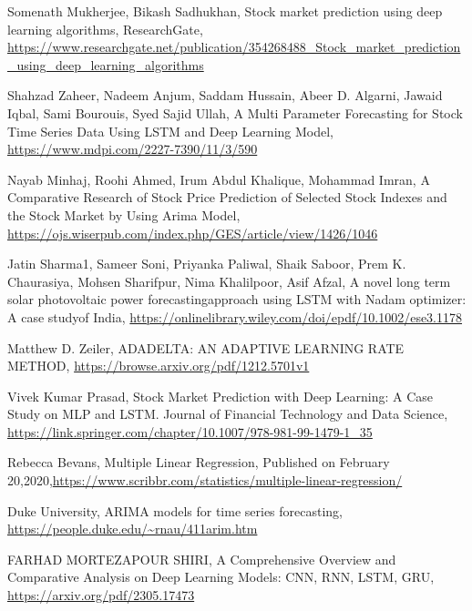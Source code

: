 \documentclass{ieeeojies}
\begin{document}
\begin{thebibliography}{00}
    Somenath Mukherjee, 
    Bikash Sadhukhan,
    Stock market prediction using deep learning algorithms,
    ResearchGate,   \url{https://www.researchgate.net/publication/354268488_Stock_market_prediction_using_deep_learning_algorithms}
    
    Shahzad Zaheer, 
    Nadeem Anjum,
    Saddam Hussain, 
    Abeer D. Algarni, 
    Jawaid Iqbal, 
    Sami Bourouis,
    Syed Sajid Ullah,
    A Multi Parameter Forecasting for Stock Time Series Data Using LSTM and Deep Learning Model,
    \url{https://www.mdpi.com/2227-7390/11/3/590}

    Nayab Minhaj, Roohi Ahmed, Irum Abdul Khalique, Mohammad Imran,
    A  Comparative  Research  of  Stock  Price  Prediction  of  Selected  Stock  Indexes and the Stock Market by Using Arima Model, \url{https://ojs.wiserpub.com/index.php/GES/article/view/1426/1046}

    Jatin Sharma1,
    Sameer Soni,
    Priyanka Paliwal,
    Shaik Saboor,
    Prem K. Chaurasiya,
    Mohsen Sharifpur,
    Nima Khalilpoor,
    Asif Afzal,
    A novel long term solar photovoltaic power forecastingapproach using LSTM with Nadam optimizer: A case studyof India,
    \url{https://onlinelibrary.wiley.com/doi/epdf/10.1002/ese3.1178}

    Matthew D. Zeiler,
    ADADELTA: AN ADAPTIVE LEARNING RATE METHOD, 
    \url{https://browse.arxiv.org/pdf/1212.5701v1}

    Vivek Kumar Prasad,
    Stock Market Prediction with Deep Learning: A Case Study on MLP and LSTM. Journal of Financial Technology and Data Science,
    \url{https://link.springer.com/chapter/10.1007/978-981-99-1479-1_35}
    
    Rebecca Bevans,
    Multiple Linear Regression, 
    Published on February 20,2020,\url{https://www.scribbr.com/statistics/multiple-linear-regression/}

    Duke University,
    ARIMA models for time series forecasting, 
    \url{https://people.duke.edu/~rnau/411arim.htm}

    FARHAD MORTEZAPOUR SHIRI,
    A Comprehensive Overview and Comparative Analysis on Deep 
Learning Models: CNN, RNN, LSTM, GRU, 
    \url{https://arxiv.org/pdf/2305.17473}


\end{thebibliography}
\end{document}
